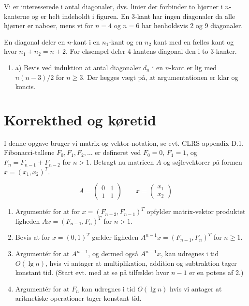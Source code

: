 \documentclass{article}
\theoremstyle{definition}
\begin{document}
Vi er interesserede i antal diagonaler, dvs. linier der forbinder to hjørner i $n$-kanterne og er helt indeholdt i figuren. En 3-kant har ingen diagonaler da alle hjørner er naboer, mens vi for $n = 4$ og $n = 6$ har henholdsvis 2 og 9 diagonaler.

En diagonal deler en $n$-kant i en $n_1$-kant og en $n_2$ kant med en fælles kant og hvor $n_1 + n_2 = n + 2$. For eksempel deler 4-kantens diagonal den i to 3-kanter.

\begin{enumerate}
    \item a) Bevis ved induktion at antal diagonaler $d_n$ i en $n$-kant er lig med $n(n-3)/2$ for $n \geq 3$. Der lægges vægt på, at argumentationen er klar og koncis.
\end{enumerate}

\section{Korrekthed og køretid}
I denne opgave bruger vi matrix og vektor-notation, se evt. CLRS appendix D.1. Fibonacci-tallene $F_0, F_1, F_2,\ldots$ er defineret ved $F_0 = 0$, $F_1 = 1$, og $F_n = F_{n-1} + F_{n-2}$ for $n > 1$. Betragt nu matricen $A$ og søjlevektorer på formen $x = (x_1, x_2)^T$.

\[
A = \begin{pmatrix} 0 & 1 \\ 1 & 1 \end{pmatrix} \qquad
x = \begin{pmatrix} x_1 \\ x_2 \end{pmatrix}
\]

\begin{enumerate}
    \item Argumentér for at for $x = (F_{n-2}, F_{n-1})^T$ opfylder matrix-vektor produktet ligheden $Ax = (F_{n-1}, F_n)^T$ for $n > 1$.
    
    \item Bevis at for $x = (0,1)^T$ gælder ligheden $A^{n-1}x = (F_{n-1}, F_n)^T$ for $n \geq 1$.
    
    \item Argumentér for at $A^{n-1}$, og dermed også $A^{n-1}x$, kan udregnes i tid $O(\lg n)$, hvis vi antager at multiplikation, addition og subtraktion tager konstant tid. (Start evt. med at se på tilfældet hvor $n-1$ er en potens af 2.)
    
    \item Argumentér for at $F_n$ kan udregnes i tid $O(\lg n)$ hvis vi antager at aritmetiske operationer tager konstant tid.
\end{enumerate}
\end{document}
